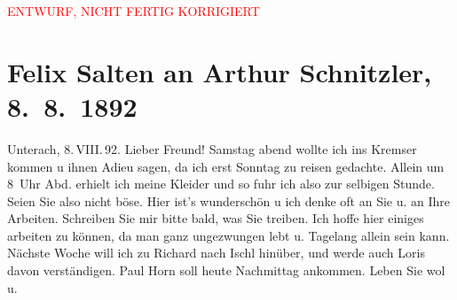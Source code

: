 
\begin{center}
            \textcolor{red}{ENTWURF, NICHT FERTIG KORRIGIERT}
                      \end{center}
            
         
         \renewcommand{\erwaehntePersonen}{Personen: Hermann Bahr, Richard Beer-Hofmann, Hugo von Hofmannsthal, Paul Horn, Gustav Schwarzkopf}
         \renewcommand{\erwaehnteOrte}{Orte: Bad Ischl, Berghof, Café Kremser, Deutschland, Unterach am Attersee}
         \renewcommand{\erwaehnteWerke}{}
               \section[Felix Salten an Arthur Schnitzler, 8. 8. 1892]{ Felix Salten an Arthur Schnitzler, 8. 8. 1892}\nopagebreak{}\rehead{ }\begin{ledgroupsized}[t]{13cm}\normalsize\beginnumbering \toendnotes[C]{\smallbreak\pagebreak[2]} 
\pstart
           {\pb}Unterach, 8. VIII. 92.
               \pend
           \pstart
           Lieber Freund! Samstag abend wollte ich ins Kremser
               kommen u ihnen Adieu sagen, da ich erst Sonntag zu reisen gedachte.
               Allein um 8 Uhr Abd. erhielt ich meine Kleider und so fuhr ich also zur selbigen
               Stunde. Seien Sie also nicht böse. Hier ist's wunderschön u ich denke oft an Sie u.
               an Ihre Arbeiten. Schreiben Sie mir bitte bald, was Sie treiben.\pend
           \pstart
           {\pb}Ich hoffe hier einiges arbeiten zu können, da man ganz ungezwungen lebt
               u. Tagelang allein sein kann. Nächste Woche will ich zu Richard nach Ischl
               hinüber, und werde auch Loris davon
               verständigen. Paul{ }{\pb}Horn soll heute Nachmittag ankommen. Leben Sie wol u.

\end{ledgroupsized}
